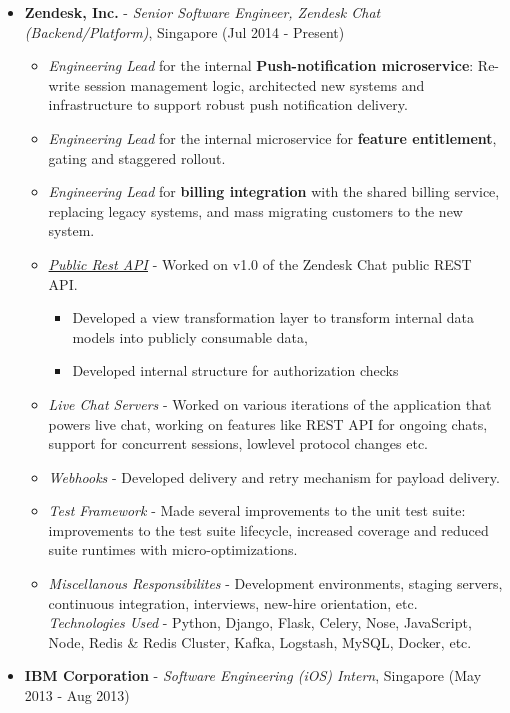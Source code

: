 \begin{itemize}
\tightlist
\item
  \textbf{Zendesk, Inc.} - \emph{Senior Software Engineer, Zendesk Chat
  (Backend/Platform)}, Singapore \hfill (Jul 2014 - Present)

  \begin{itemize}
  \tightlist
  \item
    \emph{Engineering Lead} for the internal \textbf{Push-notification
    microservice}: Re-write session management logic, architected new
    systems and infrastructure to support robust push notification
    delivery.
  \item
    \emph{Engineering Lead} for the internal microservice for
    \textbf{feature entitlement}, gating and staggered rollout.
  \item
    \emph{Engineering Lead} for \textbf{billing integration} with the
    shared billing service, replacing legacy systems, and mass migrating
    customers to the new system.
  \item
    \emph{\href{https://developer.zendesk.com/rest_api/docs/chat/introduction}{Public
    Rest API}} - Worked on v1.0 of the Zendesk Chat public REST API.

    \begin{itemize}
    \tightlist
    \item
      Developed a view transformation layer to transform internal data
      models into publicly consumable data,
    \item
      Developed internal structure for authorization checks
    \end{itemize}
  \item
    \emph{Live Chat Servers} - Worked on various iterations of the
    application that powers live chat, working on features like REST API
    for ongoing chats, support for concurrent sessions, lowlevel
    protocol changes etc.
  \item
    \emph{Webhooks} - Developed delivery and retry mechanism for payload
    delivery.
  \item
    \emph{Test Framework} - Made several improvements to the unit test
    suite: improvements to the test suite lifecycle, increased coverage
    and reduced suite runtimes with micro-optimizations.
  \item
    \emph{Miscellanous Responsibilites} - Development environments,
    staging servers, continuous integration, interviews, new-hire
    orientation, etc.\\
    \emph{Technologies Used} - Python, Django, Flask, Celery, Nose,
    JavaScript, Node, Redis \& Redis Cluster, Kafka, Logstash, MySQL,
    Docker, etc.
  \end{itemize}
\item
  \textbf{IBM Corporation} - \emph{Software Engineering (iOS) Intern},
  Singapore \hfill (May 2013 - Aug 2013)


\end{itemize}
